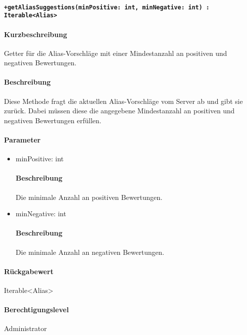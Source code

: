 \paragraph{\texttt{+getAliasSuggestions(minPositive: int, minNegative: int) : Iterable<Alias>}}%
\paragraph*{Kurzbeschreibung}
Getter für die Alias-Vorschläge mit einer Mindestanzahl an positiven und negativen Bewertungen.
\paragraph*{Beschreibung}
Diese Methode fragt die aktuellen Alias-Vorschläge vom Server ab und gibt sie zurück.
Dabei müssen diese die angegebene Mindestanzahl an positiven und negativen Bewertungen erfüllen.
\paragraph*{Parameter}
\begin{itemize}
    \item minPositive: int
            \paragraph*{Beschreibung}
            Die minimale Anzahl an positiven Bewertungen.
    \item minNegative: int
            \paragraph*{Beschreibung}
            Die minimale Anzahl an negativen Bewertungen.
\end{itemize}
\paragraph*{Rückgabewert}
Iterable<Alias>
\paragraph*{Berechtigungslevel}
Administrator